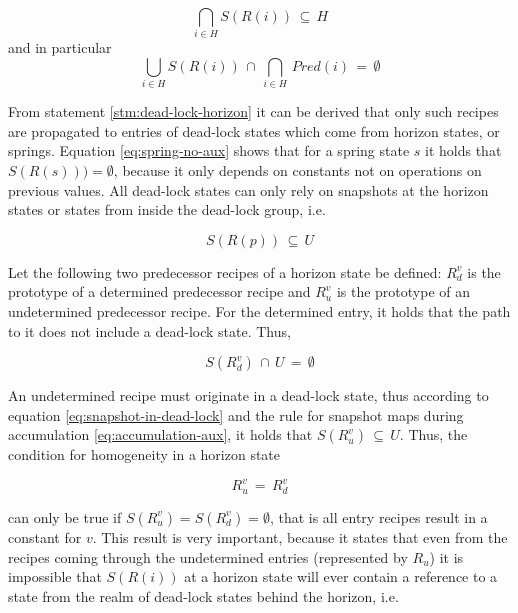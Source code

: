 \documentclass[12pt,a4paper]{scrartcl}
\begin{document}
\begin{equation}
                \bigcap_{i \in H}S(R(i))\,\subseteq\,H
\end{equation}
and in particular
\begin{equation}
    \bigcup_{i \in H}S(R(i))\,\cap\,\bigcap_{i \in H}\,Pred(i)\,=\,\emptyset
\end{equation}

From statement \ref{stm:dead-lock-horizon} it can be derived that only such
recipes are propagated to entries of dead-lock states which come from horizon
states, or springs.  Equation \eqref{eq:spring-no-aux} shows that for a spring
state $s$ it holds that $S(R(s)))=\emptyset$, because it only depends on
constants not on operations on previous values. All dead-lock states can only
rely on snapshots at the horizon states or states from inside the dead-lock
group, i.e.

\begin{equation} \label{eq:snapshot-in-dead-locks}
    S(R(p))\,\subseteq\,U
\end{equation}

Let the following two predecessor recipes of a horizon state be defined: $R^v_d$
is the prototype of a determined predecessor recipe and $R^v_u$ is the prototype
of an undetermined predecessor recipe. For the determined entry, it holds that
the path to it does not include a dead-lock state. Thus,

\begin{equation}
        S(R^v_d)\,\cap\,U\,=\,\emptyset
\end{equation}

An undetermined recipe must originate in a dead-lock state, thus according to
equation \eqref{eq:snapshot-in-dead-lock} and the rule for snapshot maps during
accumulation \eqref{eq:accumulation-aux}, it holds that
$S(R^v_u)\,\subseteq\,U$.  Thus, the condition for homogeneity in a horizon
state

\begin{equation} \label{eq:homogeneity-horizon-state}
    R^v_u\,=\,R^v_d
\end{equation}

can only be true if $S(R^v_u)=S(R^v_d)=\emptyset$, that is all entry recipes
result in a constant for $v$. This result is very important, because it states
that even from the recipes coming through the undetermined entries (represented
by $R_u$) it is impossible that $S(R(i))$ at a horizon state will ever contain
a reference to a state from the realm of dead-lock states behind the horizon,
i.e.
\end{document}
